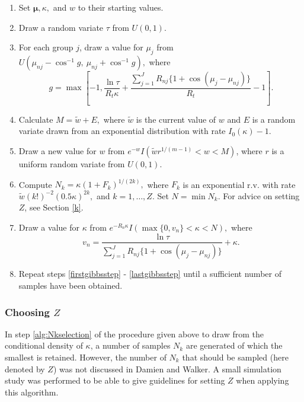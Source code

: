 \documentclass[]{gSCS2e}
\theoremstyle{plain}
\theoremstyle{definition}
\theoremstyle{remark}
\begin{document}
\begin{enumerate}



\item Set $\boldsymbol\mu, \kappa,$ and $w$ to their starting values.  

\item  Draw a random variate $\tau$ from $U(0, 1)$. \label{firstgibbsstep}

\item  For each group $j$, draw a value for $\mu_j$ from $U(\mu_{nj} - \cos^{-1}g,~ \mu_{nj} + \cos^{-1}g),$ where $$ g=\max\left[-1, \frac{\ln \tau}{R_t \kappa} + \frac{\sum_{j=1}^{J} R_{nj} \{ 1 + \cos (\mu_j - \mu_{nj} ) \} } {R_t} - 1 \right]. $$

\item Calculate $ M = \tilde{w} + E,$ where $\tilde{w}$ is the current value of $w$ and $E$ is a random variate drawn from an exponential distribution with rate $I_0(\kappa) - 1$.

\item  Draw a new value for $w$ from $e^{-w} I(\tilde{w}r^{1/(m-1)} < w < M)$, where $r$ is a uniform random variate from $U(0,1)$. 

\item Compute $ N_k = \kappa (1 + F_k)^{1/(2k)},$ where $F_k$ is an exponential r.v. with rate $\tilde{w}(k!)^{-2} (0.5\kappa )^{2k},$ and $k = 1, \dots, Z$. Set $N = \min N_k$. For advice on setting $Z$, see Section \ref{k}. \label{alg:Nkselection} 

\item  Draw a value for $\kappa$ from $e^{-R_n\kappa} I( \max\{0, v_n\} < \kappa < N),$ where $$ v_n = \frac{\ln \tau}{\sum_{j=1}^{J} R_{nj} \{1+\cos(\mu_j - \mu_{nj}) \} } + \kappa.$$ \label{lastgibbsstep}

\item Repeat steps \ref{firstgibbsstep} - \ref{lastgibbsstep} until a sufficient number of samples have been obtained.

\end{enumerate}  


\subsubsection{Choosing $Z$ \label{k}}

In step \ref{alg:Nkselection} of the procedure given above to draw from the conditional density of $\kappa$, a number of samples $N_k$ are generated of which the smallest is retained. However, the number of $N_k$  that should be sampled (here denoted by $Z$) was not discussed in Damien and Walker.\cite{damien1999fullbayes} A small simulation study was performed to be able to give guidelines for setting $Z$ when applying this algorithm. 
\end{document}
